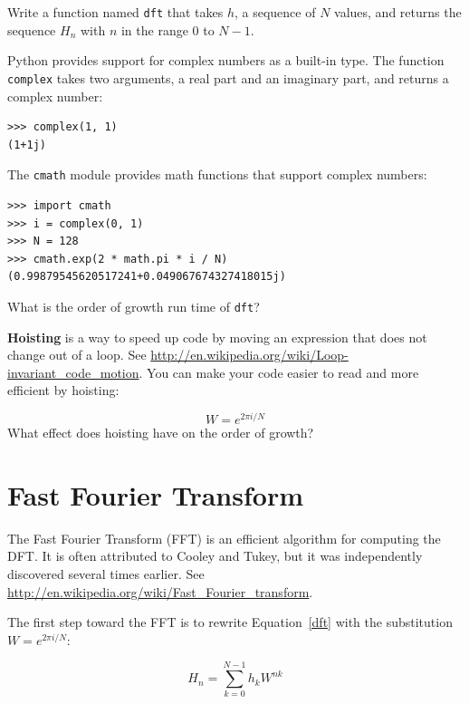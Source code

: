 \documentclass[10pt]{book}
\begin{document}
\begin{ex}

Write a function named {\tt dft} that takes $h$, a sequence of $N$
values, and returns the sequence $H_n$ with $n$ in the range $0$ to
$N-1$.

Python provides support for complex numbers as a built-in type.
The function {\tt complex} takes two arguments, a real part
and an imaginary part, and returns a complex number:

\begin{verbatim}
>>> complex(1, 1)
(1+1j)
\end{verbatim}

The {\tt cmath} module provides math functions that support
complex numbers:

\begin{verbatim}
>>> import cmath
>>> i = complex(0, 1)
>>> N = 128
>>> cmath.exp(2 * math.pi * i / N)
(0.99879545620517241+0.049067674327418015j)

\end{verbatim}

What is the order of growth run time of {\tt dft}?

{\bf Hoisting} is a way to speed up code by moving an
expression that does not change out of a loop.
See \url{http://en.wikipedia.org/wiki/Loop-invariant_code_motion}.
You can make your code easier to read and more efficient
by hoisting:

\begin{equation}
W = e^{2 \pi i / N}
\end{equation}
%
What effect does hoisting have on the order of growth?

\end{ex}


\section{Fast Fourier Transform}
 
The Fast Fourier Transform (FFT) is an efficient algorithm for
computing the DFT.  It is often attributed to Cooley and Tukey,
but it was independently discovered several times earlier.
See \url{http://en.wikipedia.org/wiki/Fast_Fourier_transform}.

The first step toward the FFT is to rewrite Equation~\ref{dft}
with the substitution $W = e^{2 \pi i/N}$:

\begin{equation}
H_n = \sum_{k=0}^{N-1} h_k W^{n k}
\end{equation}
\end{document}
